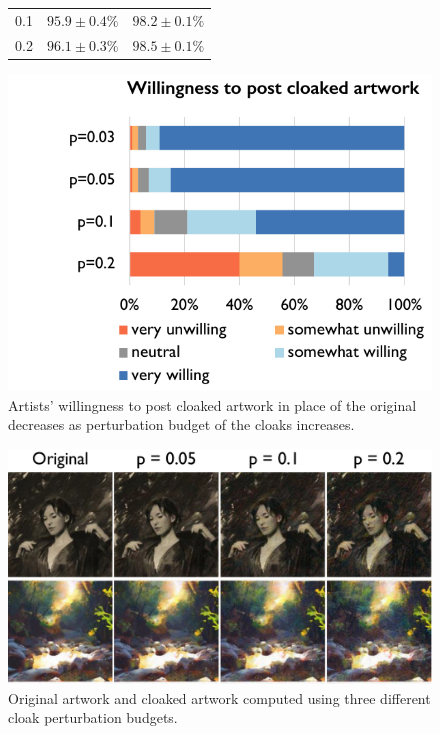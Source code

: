\begin{figure}[t]
\begin{minipage}{0.32\textwidth}
{\begin{tabular}{lcc}
    0.1 & $95.9 \pm 0.4\%$& $98.2 \pm 0.1\%$ \\
    0.2 & $96.1 \pm 0.3\%$ & $98.5 \pm 0.1\%$ \\ \bottomrule
    \end{tabular}
    }
    \vspace{0.13in}
    \label{tab:budget-increase-sd}
  \end{minipage}
  \hfill
\centering
  \begin{minipage}{0.32\textwidth}
  \centering
  \includegraphics[width=1\columnwidth]{plots/eval/user-accept.pdf}
  \vspace{-0.23in}
  \caption{Artists' willingness to post cloaked artwork in place of the original decreases as perturbation budget of the cloaks increases. }
  \label{fig:artist-accept} 
  \end{minipage}
    \hfill
\end{figure}

\begin{figure}[t]
  \centering
  \includegraphics[width=0.90\columnwidth]{plots/eval/cloak-perturbation.pdf}
  \vspace{-0.08in}
  \caption{Original artwork and cloaked artwork computed using three different cloak perturbation budgets. }
  \label{fig:before-after}
\end{figure}

